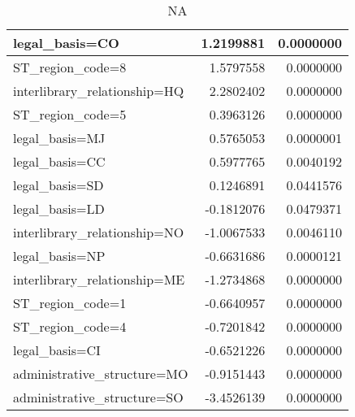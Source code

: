 \documentclass[14pt,]{article}
\begin{document}
\begin{table}
\begin{table}
\begin{tabular}[t]{l|r|r}
\hline
legal\_basis=CO & 1.2199881 & 0.0000000\\
\hline
ST\_region\_code=8 & 1.5797558 & 0.0000000\\
\hline
interlibrary\_relationship=HQ & 2.2802402 & 0.0000000\\
\hline
ST\_region\_code=5 & 0.3963126 & 0.0000000\\
\hline
legal\_basis=MJ & 0.5765053 & 0.0000001\\
\hline
legal\_basis=CC & 0.5977765 & 0.0040192\\
\hline
legal\_basis=SD & 0.1246891 & 0.0441576\\
\hline
legal\_basis=LD & -0.1812076 & 0.0479371\\
\hline
interlibrary\_relationship=NO & -1.0067533 & 0.0046110\\
\hline
legal\_basis=NP & -0.6631686 & 0.0000121\\
\hline
interlibrary\_relationship=ME & -1.2734868 & 0.0000000\\
\hline
ST\_region\_code=1 & -0.6640957 & 0.0000000\\
\hline
ST\_region\_code=4 & -0.7201842 & 0.0000000\\
\hline
legal\_basis=CI & -0.6521226 & 0.0000000\\
\hline
administrative\_structure=MO & -0.9151443 & 0.0000000\\
\hline
administrative\_structure=SO & -3.4526139 & 0.0000000\\
\hline
\end{tabular}
\end{table}\begin{table}
\caption{NA}


\end{table}
\end{table}
\end{document}
